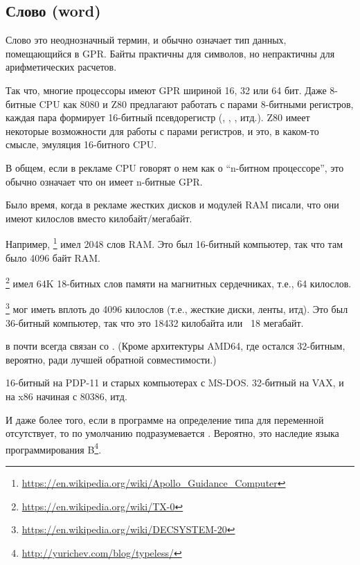 \subsection{Слово (word)}

Слово  это неоднозначный термин, и обычно означает тип данных, помещающийся в \ac{GPR}.
Байты практичны для символов, но непрактичны для арифметических расчетов.

Так что, многие процессоры имеют \ac{GPR} шириной 16, 32 или 64 бит.
Даже 8-битные \ac{CPU} как 8080 и Z80 предлагают работать с парами 8-битными регистров, каждая пара формирует 16-битный
псевдорегистр
(, , , итд.).
Z80 имеет некоторые возможности для работы с парами регистров, и это, в каком-то смысле, эмуляция 16-битного CPU.

В общем, если в рекламе CPU говорят о нем как о ``n-битном процессоре'', это обычно означает что он имеет n-битные \ac{GPR}.

Было время, когда в рекламе жестких дисков и модулей \ac{RAM} писали, что они имеют  килослов вместо
 килобайт/мегабайт.

Например, \footnote{\url{https://en.wikipedia.org/wiki/Apollo_Guidance_Computer}}
имел 2048 слов \ac{RAM}.
Это был 16-битный компьютер, так что там было 4096 байт \ac{RAM}.

\footnote{\url{https://en.wikipedia.org/wiki/TX-0}} имел 64K 18-битных слов памяти на магнитных сердечниках,
т.е., 64 килослов.

\footnote{\url{https://en.wikipedia.org/wiki/DECSYSTEM-20}}
мог иметь вплоть до 4096 килослов 
(т.е., жесткие диски, ленты, итд).
Это был 36-битный компьютер, так что это 18432 килобайта или ~18 мегабайт.

\myhrule{}

 в \CCpp почти всегда связан со .
(Кроме архитектуры AMD64, где  остался 32-битным, вероятно, ради лучшей обратной совместимости.)

 16-битный на PDP-11 и старых компьютерах с MS-DOS.
 32-битный на VAX, и на x86 начиная с 80386, итд.

И даже более того, если в программе на \CCpp{} определение типа для переменной отсутствует,
то по умолчанию подразумевается .
Вероятно, это наследие языка программирования B\footnote{\url{http://yurichev.com/blog/typeless/}}.

\myhrule{}

